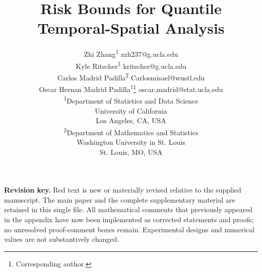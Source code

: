 \documentclass[twoside,11pt]{article}
\newcommand{\rev}[1]{{\color{revisionred}#1}}
\begin{document}
\allowdisplaybreaks[3]

\title{Risk Bounds for Quantile Temporal-Spatial Analysis}


\author{
\name Zhi Zhang\textsuperscript{1} \email zzh237@g.ucla.edu \\
\name Kyle Ritscher\textsuperscript{1} \email kritscher@g.ucla.edu \\
\name Carlos Madrid Padilla\textsuperscript{2} \email Carlosmisael@wustl.edu \\
\name Oscar Hernan Madrid Padilla\textsuperscript{1}\thanks{Corresponding author.} \email oscar.madrid@stat.ucla.edu \\
\textsuperscript{1}\addr Department of Statistics and Data Science\\
University of California\\
Los Angeles, CA, USA \\
\textsuperscript{2}\addr Department of Mathematics and Statistics\\
Washington University in St. Louis\\
St. Louis, MO, USA
}



\maketitle

\begin{center}
\rev{\textbf{Revision key.} Red text is new or materially revised relative to the supplied manuscript. The main paper and the complete supplementary material are retained in this single file. All mathematical comments that previously appeared in the appendix have now been implemented as corrected statements and proofs; no unresolved proof-comment boxes remain. Experimental designs and numerical values are not substantively changed.}
\end{center}
\end{document}
